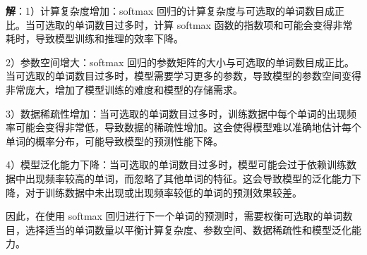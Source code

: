 \documentclass[UTF8]{ctexart}
\begin{document}
	\noindent \textbf{解}：1）计算复杂度增加：softmax 回归的计算复杂度与可选取的单词数目成正比。当可选取的单词数目过多时，计算 softmax 函数的指数项和可能会变得非常耗时，导致模型训练和推理的效率下降。
	
	2）参数空间增大：softmax 回归的参数矩阵的大小与可选取的单词数目成正比。当可选取的单词数目过多时，模型需要学习更多的参数，导致模型的参数空间变得非常庞大，增加了模型训练的难度和模型的存储需求。
	
	3）数据稀疏性增加：当可选取的单词数目过多时，训练数据中每个单词的出现频率可能会变得非常低，导致数据的稀疏性增加。这会使得模型难以准确地估计每个单词的概率分布，可能导致模型的预测性能下降。
	
	4）模型泛化能力下降：当可选取的单词数目过多时，模型可能会过于依赖训练数据中出现频率较高的单词，而忽略了其他单词的特征。这会导致模型的泛化能力下降，对于训练数据中未出现或出现频率较低的单词的预测效果较差。
	
	因此，在使用 softmax 回归进行下一个单词的预测时，需要权衡可选取的单词数目，选择适当的单词数量以平衡计算复杂度、参数空间、数据稀疏性和模型泛化能力。
	
\end{document}

